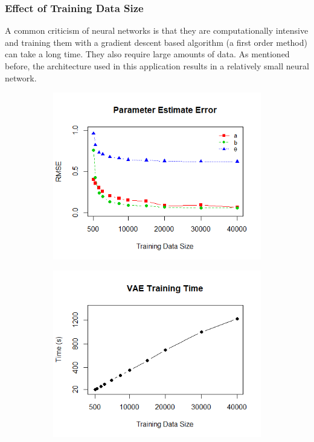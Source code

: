 \subsubsection{Effect of Training Data Size}
A common criticism of neural networks is that they are computationally intensive and training them with a gradient descent based algorithm (a first order method) can take a long time. They also require large amounts of data. As mentioned before, the architecture used in this application results in a relatively small neural network.

\begin{figure}[h]
\centering
    \begin{subfigure}{.47\textwidth}
      \centering
      \includegraphics[width=\linewidth]{img/ml_journal_results/vae_full_train_size_error.png}
    \end{subfigure}
    \begin{subfigure}{.47\textwidth}
      \centering
      \includegraphics[width=\linewidth]{img/ml_journal_results/vae_full_train_size_time.png}

\end{subfigure}
\end{figure}
